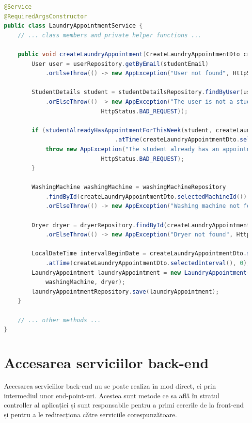 \documentclass[12pt,a4paper]{report}
\theoremstyle{definition}
\theoremstyle{remark}
\begin{document}
\begin{lstlisting}[language=Java, caption={Clasa LaundryAppointmentService}]
@Service
@RequiredArgsConstructor
public class LaundryAppointmentService {
    // ... class members and private helper functions ...

    public void createLaundryAppointment(CreateLaundryAppointmentDto createLaundryAppointmentDto, String studentEmail) throws AppException {
        User user = userRepository.getByEmail(studentEmail)
            .orElseThrow(() -> new AppException("User not found", HttpStatus.NOT_FOUND));

        StudentDetails student = studentDetailsRepository.findByUser(user)
            .orElseThrow(() -> new AppException("The user is not a student",
                            HttpStatus.BAD_REQUEST));

        if (studentAlreadyHasAppointmentForThisWeek(student, createLaundryAppointmentDto.selectedDate()
                                .atTime(createLaundryAppointmentDto.selectedInterval(), 0))) {
            throw new AppException("The student already has an appointment for this week",
                            HttpStatus.BAD_REQUEST);
        }

        WashingMachine washingMachine = washingMachineRepository
            .findById(createLaundryAppointmentDto.selectedMachineId())
            .orElseThrow(() -> new AppException("Washing machine not found", HttpStatus.NOT_FOUND));

        Dryer dryer = dryerRepository.findById(createLaundryAppointmentDto.selectedDryerId())
            .orElseThrow(() -> new AppException("Dryer not found", HttpStatus.NOT_FOUND));

        LocalDateTime intervalBeginDate = createLaundryAppointmentDto.selectedDate()
            .atTime(createLaundryAppointmentDto.selectedInterval(), 0);
        LaundryAppointment laundryAppointment = new LaundryAppointment(intervalBeginDate, student,
            washingMachine, dryer);
        laundryAppointmentRepository.save(laundryAppointment);
    }

    // ... other methods ...
}
\end{lstlisting}

\section{Accesarea serviciilor back-end}


\par Accesarea serviciilor back-end nu se poate realiza în mod direct, ci prin intermediul unor end-point-uri. Acestea sunt metode ce sa află în stratul controller al aplicației și sunt responsabile pentru a primi cererile de la front-end și pentru a le redirecționa către serviciile corespunzătoare.
\end{document}
